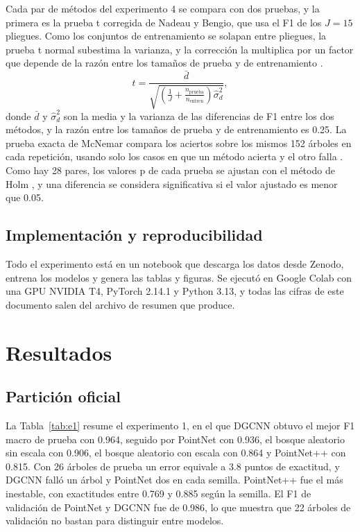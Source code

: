 \documentclass[preprint,12pt]{elsarticle}
\begin{document}
Cada par de métodos del experimento 4 se compara con dos pruebas, y la primera es la prueba t corregida de Nadeau y Bengio, que usa el F1 de los $J=15$ pliegues. Como los conjuntos de entrenamiento se solapan entre pliegues, la prueba t normal subestima la varianza, y la corrección la multiplica por un factor que depende de la razón entre los tamaños de prueba y de entrenamiento \cite{nadeau2003inference}.
\begin{equation}
t = \frac{\bar{d}}{\sqrt{\left(\frac{1}{J} + \frac{n_{\text{prueba}}}{n_{\text{entren}}}\right)\hat{\sigma}_d^{2}}},
\label{eq:nb}
\end{equation}
donde $\bar{d}$ y $\hat{\sigma}_d^2$ son la media y la varianza de las diferencias de F1 entre los dos métodos, y la razón entre los tamaños de prueba y de entrenamiento es 0.25. La prueba exacta de McNemar compara los aciertos sobre los mismos 152 árboles en cada repetición, usando solo los casos en que un método acierta y el otro falla \cite{dietterich1998tests}. Como hay 28 pares, los valores p de cada prueba se ajustan con el método de Holm \cite{holm1979simple}, y una diferencia se considera significativa si el valor ajustado es menor que 0.05.

\subsection{Implementación y reproducibilidad}

Todo el experimento está en un notebook que descarga los datos desde Zenodo, entrena los modelos y genera las tablas y figuras. Se ejecutó en Google Colab con una GPU NVIDIA T4, PyTorch 2.14.1 y Python 3.13, y todas las cifras de este documento salen del archivo de resumen que produce.

\section{Resultados}
\label{sec:resultados}

\subsection{Partición oficial}

La Tabla~\ref{tab:e1} resume el experimento 1, en el que DGCNN obtuvo el mejor F1 macro de prueba con 0.964, seguido por PointNet con 0.936, el bosque aleatorio sin escala con 0.906, el bosque aleatorio con escala con 0.864 y PointNet++ con 0.815. Con 26 árboles de prueba un error equivale a 3.8 puntos de exactitud, y DGCNN falló un árbol y PointNet dos en cada semilla. PointNet++ fue el más inestable, con exactitudes entre 0.769 y 0.885 según la semilla. El F1 de validación de PointNet y DGCNN fue de 0.986, lo que muestra que 22 árboles de validación no bastan para distinguir entre modelos.
\end{document}
